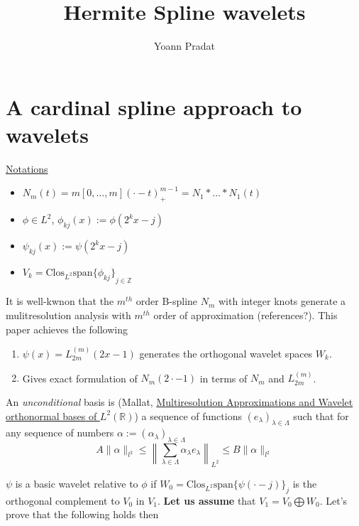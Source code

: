 \documentclass[a4paper, 11pt]{article}
\begin{document}
\title{Hermite Spline wavelets}
\author{Yoann Pradat}
\maketitle
\tableofcontents

\section{A cardinal spline approach to wavelets}

\underline{Notations}
\begin{itemize}
  \item $N_m(t) = m[0, \ldots, m]{(\cdot-t)}_+^{m-1} = N_1 * \ldots * N_1(t)$
  \item $\phi \in L^2$, $\phi_{kj}(x) := \phi(2^k x-j)$
  \item $\psi_{kj}(x) := \psi(2^k x-j)$
  \item $V_k = \text{Clos}_{L^2} \text{span} {\{\phi_{kj}\}}_{j\in \mathbb{Z}}$
\end{itemize}

It is well-kwnon that the $m^{th}$ order B-spline $N_m$ with integer knots generate a mulitresolution analysis with 
$m^{th}$ order of approximation (references?). This paper achieves the following
\begin{enumerate}
  \item $\psi(x) = L_{2m}^{(m)}(2x-1)$ generates the orthogonal wavelet spaces $W_k$.
  \item Gives exact formulation of $N_{m}(2\cdot - 1)$ in terms of $N_{m}$ and $L_{2m}^{(m)}$.
\end{enumerate}

An \emph{unconditional} basis is (Mallat, \underline{Multiresolution Approximations and Wavelet orthonormal bases of 
$L^2(\mathbb{R})$}) a sequence of functions ${(e_{\lambda})}_{\lambda \in \Lambda}$ such that for any sequence of 
numbers $\alpha := {(\alpha_{\lambda})}_{\lambda \in \Lambda}$
\begin{equation*}
  A \|\alpha\|_{l^2} \leq {\left\|\sum_{\lambda \in \Lambda} \alpha_{\lambda}e_{\lambda} \right\|}_{L^2} \leq B 
  \|\alpha\|_{l^2}
\end{equation*}

$\psi$ is a basic wavelet relative to $\phi$ if $W_0 = \text{Clos}_{L^2} \text{span} {\{\psi(\cdot-j)\}}_{j}$ is the 
orthogonal complement to $V_0$ in $V_1$. \textbf{Let us assume} that $V_1 = V_0 \bigoplus W_0$. Let's prove that the 
following holds then
\end{document}
